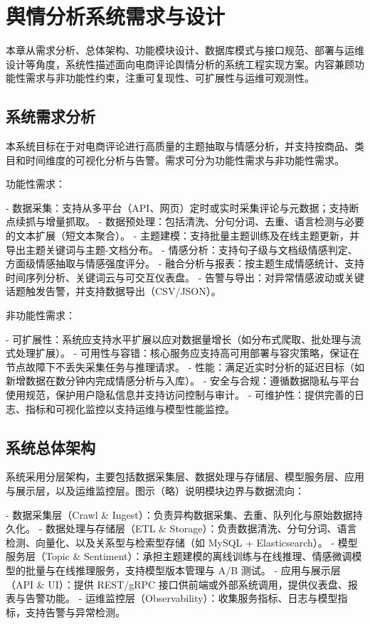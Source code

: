 \chapter{舆情分析系统需求与设计}
\label{ch:system_design}

本章从需求分析、总体架构、功能模块设计、数据库模式与接口规范、部署与运维设计等角度，系统性描述面向电商评论舆情分析的系统工程实现方案。内容兼顾功能性需求与非功能性约束，注重可复现性、可扩展性与运维可观测性。

\section{系统需求分析}
\label{sec:requirements}

本系统目标在于对电商评论进行高质量的主题抽取与情感分析，并支持按商品、类目和时间维度的可视化分析与告警。需求可分为功能性需求与非功能性需求。

功能性需求：

- 数据采集：支持从多平台（API、网页）定时或实时采集评论与元数据；支持断点续抓与增量抓取。 
- 数据预处理：包括清洗、分句分词、去重、语言检测与必要的文本扩展（短文本聚合）。
- 主题建模：支持批量主题训练及在线主题更新，并导出主题关键词与主题-文档分布。
- 情感分析：支持句子级与文档级情感判定、方面级情感抽取与情感强度评分。
- 融合分析与报表：按主题生成情感统计、支持时间序列分析、关键词云与可交互仪表盘。
- 告警与导出：对异常情感波动或关键话题触发告警，并支持数据导出（CSV/JSON）。

非功能性需求：

- 可扩展性：系统应支持水平扩展以应对数据量增长（如分布式爬取、批处理与流式处理扩展）。
- 可用性与容错：核心服务应支持高可用部署与容灾策略，保证在节点故障下不丢失采集任务与推理请求。 
- 性能：满足近实时分析的延迟目标（如新增数据在数分钟内完成情感分析与入库）。
- 安全与合规：遵循数据隐私与平台使用规范，保护用户隐私信息并支持访问控制与审计。 
- 可维护性：提供完善的日志、指标和可视化监控以支持运维与模型性能监控。

\section{系统总体架构}
\label{sec:architecture}

系统采用分层架构，主要包括数据采集层、数据处理与存储层、模型服务层、应用与展示层，以及运维监控层。图示（略）说明模块边界与数据流向：

- 数据采集层（Crawl \& Ingest）：负责异构数据采集、去重、队列化与原始数据持久化。
- 数据处理与存储层（ETL \& Storage）：负责数据清洗、分句分词、语言检测、向量化、以及关系型与检索型存储（如 MySQL + Elasticsearch）。
- 模型服务层（Topic \& Sentiment）：承担主题建模的离线训练与在线推理、情感微调模型的批量与在线推理服务，支持模型版本管理与 A/B 测试。 
- 应用与展示层（API \& UI）：提供 REST/gRPC 接口供前端或外部系统调用，提供仪表盘、报表与告警功能。 
- 运维监控层（Observability）：收集服务指标、日志与模型指标，支持告警与异常检测。

